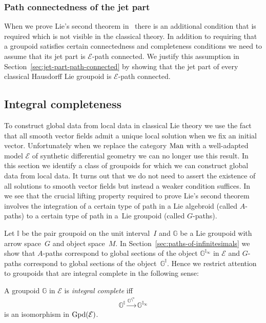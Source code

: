 \documentclass[pdftex]{sigma}
\numberwithin{equation}{section}
\begin{document}
\subsubsection{Path connectedness of the jet part}

When we prove Lie's second theorem in~\cite{burke-relative-to-local-models} there is an additional condition that is required which is not visible in the classical theory. In addition to requiring that a groupoid satisf\/ies certain connectedness and completeness conditions we need to assume that its jet part is $\mathcal{E}$-path connected. We justify this assumption in Section~\ref{sec:jet-part-path-connected} by showing that the jet part of every classical Hausdorf\/f Lie groupoid is $\mathcal{E}$-path connected.

\subsection{Integral completeness}

To construct global data from local data in classical Lie theory we use the fact that all smooth vector f\/ields admit a unique local solution when we f\/ix an initial vector. Unfortunately when we replace the category ${\rm Man}$ with a well-adapted model $\mathcal{E}$ of synthetic dif\/ferential geometry we can no longer use this result. In this section we identify a class of groupoids for which we can construct global data from local data. It turns out that we do not need to assert the existence of all solutions to smooth vector f\/ields but instead a weaker condition suf\/f\/ices. In~\cite{MR1973056} we see that the crucial lifting property required to prove Lie's second theorem involves the integration of a certain type of path in a Lie algebroid (called $A$-paths) to a certain type of path in a~Lie groupoid (called $G$-paths).

Let $\mathbb{I}$ be the pair groupoid on the unit interval~$I$ and $\mathbb{G}$ be a Lie groupoid with arrow space~$G$ and object space~$M$. In Section~\ref{sec:paths-of-infinitesimals} we show that $A$-paths correspond to global sections of the object $\mathbb{G}^{\mathbb{I}_{\infty}}$ in $\mathcal{E}$ and $G$-paths correspond to global sections of the object~$\mathbb{G}^{\mathbb{I}}$. Hence we restrict attention to groupoids that are integral complete in the following sense:
\begin{Definition}\label{def:integral-complete}
 A groupoid $\mathbb{G}$ in $\mathcal{E}$ is \emph{integral complete} if\/f
 \begin{gather*}\mathbb{G}^{\mathbb{I}} \xrightarrow{\mathbb{G}^{\iota_{\mathbb{I}}^{\infty}}} \mathbb{G}^{\mathbb{I}_{\infty}}\end{gather*}
 is an isomorphism in ${\rm Gpd}(\mathcal{E})$.
\end{Definition}
\end{document}
